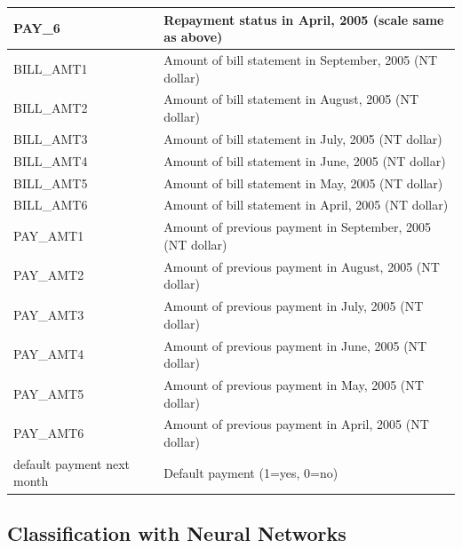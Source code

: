 \begin{table}
{\begin{tabular}{|l|l|}
PAY\_6                     &           Repayment status in April, 2005 (scale same as above)           \\ \hline
BILL\_AMT1                 &           Amount of bill statement in September, 2005 (NT dollar)           \\ \hline
BILL\_AMT2                 &            Amount of bill statement in August, 2005 (NT dollar)          \\ \hline
BILL\_AMT3                 &              Amount of bill statement in July, 2005 (NT dollar)        \\ \hline
BILL\_AMT4                 &            Amount of bill statement in June, 2005 (NT dollar)          \\ \hline
BILL\_AMT5                 &           Amount of bill statement in May, 2005 (NT dollar)           \\ \hline
BILL\_AMT6                 &           Amount of bill statement in April, 2005 (NT dollar)           \\ \hline
PAY\_AMT1                  &               Amount of previous payment in September, 2005 (NT dollar)       \\ \hline
PAY\_AMT2                  &          Amount of previous payment in August, 2005 (NT dollar)            \\ \hline
PAY\_AMT3                  &              Amount of previous payment in July, 2005 (NT dollar)        \\ \hline
PAY\_AMT4                  &              Amount of previous payment in June, 2005 (NT dollar)        \\ \hline
PAY\_AMT5                  &              Amount of previous payment in May, 2005 (NT dollar)        \\ \hline
PAY\_AMT6                  &           Amount of previous payment in April, 2005 (NT dollar)           \\ \hline
default payment next month &             Default payment (1=yes, 0=no)         \\ \hline
\end{tabular}}
\end{table}
\subsection{Classification with Neural Networks}

